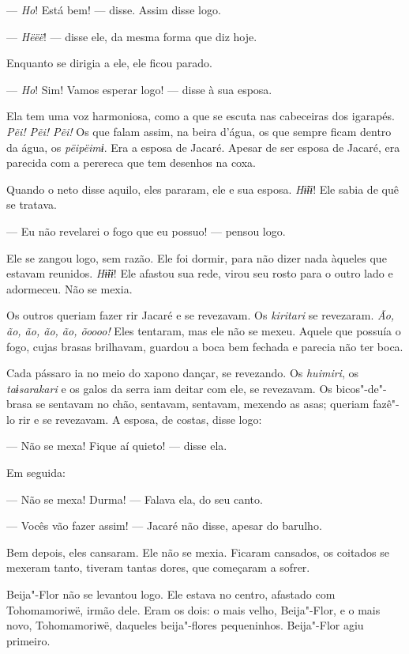 --- \emph{Ho}! Está bem! --- disse. Assim disse logo. 

--- \emph{Hëëë}! --- disse ele, da mesma forma que diz hoje. 

Enquanto se dirigia a ele, ele ficou parado. 

--- \emph{Ho}! Sim! Vamos esperar logo! --- disse à sua esposa. 

Ela tem uma voz harmoniosa, como a que se escuta nas cabeceiras dos
igarapés. \emph{Pẽi! Pẽi! Pẽi!} Os que falam assim, na beira d'água, os
que sempre ficam dentro da água, os \emph{pëipëimɨ}. Era a esposa de
Jacaré. Apesar de ser esposa de Jacaré, era parecida com a perereca que
tem desenhos na coxa. 

Quando o neto disse aquilo, eles pararam, ele e sua esposa. \emph{Hɨ̃ɨɨ}!
Ele sabia de quê se tratava. 

--- Eu não revelarei o fogo que eu possuo! --- pensou logo. 

Ele se zangou logo, sem razão. Ele foi dormir, para não dizer nada
àqueles que estavam reunidos. \emph{Hɨ̃ɨɨ}! Ele afastou sua rede, virou
seu rosto para o outro lado e adormeceu. Não se mexia. 

Os outros queriam fazer rir Jacaré e se revezavam. Os \emph{kiritari} se
revezaram. \emph{Ão, ão, ão, ão, ão, õoooo!} Eles tentaram, mas ele não
se mexeu. Aquele que possuía o fogo, cujas brasas brilhavam, guardou a
boca bem fechada e parecia não ter boca. 

Cada pássaro ia no meio do xapono dançar, se revezando.
Os \emph{huimiri}, os \emph{taɨsarakari} e os galos da serra iam deitar
com ele, se revezavam. Os bicos"-de"-brasa se sentavam no chão, sentavam,
sentavam, mexendo as asas; queriam fazê"-lo rir e se revezavam. A esposa,
de costas, disse logo: 

--- Não se mexa! Fique aí quieto! --- disse ela.

Em seguida:

--- Não se mexa! Durma! --- Falava ela, do seu canto.

--- Vocês vão fazer assim! --- Jacaré não disse, apesar do barulho. 

Bem depois, eles cansaram. Ele não se mexia. Ficaram cansados, os
coitados se mexeram tanto, tiveram tantas dores, que começaram a
sofrer. 

Beija"-Flor não se levantou logo. Ele estava no centro, afastado com
Tohomamoriwë, irmão dele. Eram os dois: o mais velho, Beija"-Flor, e o
mais novo, Tohomamoriwë, daqueles beija"-flores pequeninhos. Beija"-Flor
agiu primeiro. 

